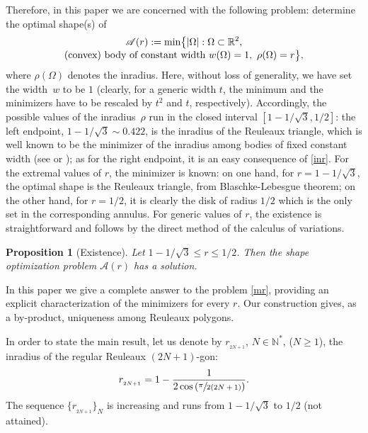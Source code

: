 \documentclass[JEP,XML,SOM,Unicode,NoFloatCountersInSection]{cedram}
\let\mathcal\mathscr
\let\sep :
\theoremstyle{plain}
\newtheorem{proposition}[theorem]{Proposition}
\theoremstyle{definition}
\newcommand\A{\mathcal A}
\renewcommand\r{r_{_{2N+1}}}
\begin{document}
Therefore, in this paper we are concerned with the following problem: determine the optimal shape(s) of\vspace*{-3pt}
\begin{multline}\label{mr}
\A(r):=\min \bigl\{|\Omega|\sep \Omega \subset \mathbb R^2,\\[-3pt] \hbox{(convex) body of constant width $w(\Omega)=1$},\ \rho(\Omega)=r\bigr\},
\end{multline}
where $\rho(\Omega)$ denotes the inradius. Here, without loss of generality, we have set the width~$w$ to be $1$ (clearly, for a generic width $t$, the minimum and the minimizers have to be rescaled by $t^2$ and $t$, respectively). Accordingly, the possible values of the inradius~$\rho$ run in the closed interval $[1-1/\sqrt{3}, 1/2]$:
{the left endpoint, $1-1/\sqrt{3} \sim 0.422$, is the inradius of the Reuleaux triangle, which is well known to be the minimizer of the inradius among bodies of fixed constant width (see \cite{BF}
or \cite{CG}); as for the right endpoint, it is an easy consequence of \eqref{inr}.}
For the extremal values of $r$, the minimizer is known: on one hand, for $r=1-1/\sqrt{3}$, the optimal shape is the Reuleaux triangle, from Blaschke-Lebesgue theorem; on the other hand, for $r=1/2$, it is clearly the disk of radius $1/2$ which is the only set in the corresponding annulus.
For generic values of $r$, the existence is straightforward and follows by the direct method of the calculus of variations.

\begin{proposition}[Existence]\label{prop1}
Let $1-1/\sqrt{3}\leq r \leq 1/2$. Then the shape optimization problem $\A(r)$ has a solution.
\end{proposition}

In this paper we give a complete answer to the problem \eqref{mr}, providing an explicit characterization of the minimizers for every $r$.
Our construction gives, as a by-product, uniqueness {among Reuleaux polygons}.

In order to state the main result, let us denote by $\r$, $N\in \mathbb N^*$, {($N\geq 1$)}, the inradius of the regular Reuleaux $(2N+1)$-gon:
\[
\r=1-\frac{1}{2\cos\left(\sfrac{\pi}{2(2N+1)}\right)}.
\]
The sequence $\{\r\}_N$ is increasing and runs from $1-1/\sqrt{3}$ to $1/2$ (not attained).
\end{document}
